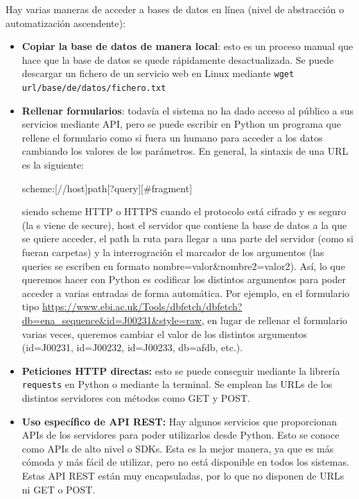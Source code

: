 Hay varias maneras de acceder a bases de datos en línea (nivel de abstracción o automatización ascendente):
\begin{itemize}
\item \textbf{Copiar la base de datos de manera local}: esto es un proceso manual que hace que la base de datos se quede rápidamente desactualizada. Se puede descargar un fichero de un servicio web en Linux mediante \texttt{wget url/base/de/datos/fichero.txt}
\item \textbf{Rellenar formularios}: todavía el sistema no ha dado acceso al público a sus servicios mediante API, pero se puede escribir en Python un programa que rellene el formulario como si fuera un humano para acceder a los datos cambiando los valores de los parámetros. En general, la sintaxis de una URL es la siguiente:
\begin{center}
scheme:[//host]path[?query][\#fragment]\\
\end{center}
siendo scheme HTTP o HTTPS cuando el protocolo está cifrado y es seguro (la s viene de secure), host el servidor que contiene la base de datos a la que se quiere acceder, el path la ruta para llegar a una parte del servidor (como si fueran carpetas) y la interrogración el marcador de los argumentos (las queries se escriben en formato nombre=valor\&nombre2=valor2). Así, lo que queremos hacer con Python es codificar los distintos argumentos para poder acceder a varias entradas de forma automática. Por ejemplo, en el formulario tipo \href{https://www.ebi.ac.uk/Tools/dbfetch/dbfetch?db=ena\_sequence\&id=J00231\&style=raw}{https://www.ebi.ac.uk/Tools/dbfetch/dbfetch?db=ena\_sequence\&id=J00231\&style=raw}, en lugar de rellenar el formulario varias veces, queremos cambiar el valor de los distintos argumentos (id=J00231, id=J00232, id=J00233, db=afdb, etc.). 
\item \textbf{Peticiones HTTP directas:} esto se puede conseguir mediante la librería \texttt{requests} en Python o mediante la terminal. Se emplean las URLs de los distintos servidores con métodos como GET y POST.
\item \textbf{Uso específico de API REST:} Hay algunos servicios que proporcionan APIs de los servidores para poder utilizarlos desde Python. Esto se conoce como APIs de alto nivel o SDKs. Esta es la mejor manera, ya que es más cómoda y más fácil de utilizar, pero no está disponible en todos los sistemas. Estas API REST están muy encapsuladas, por lo que no disponen de URLs ni GET o POST.
\end{itemize} 


